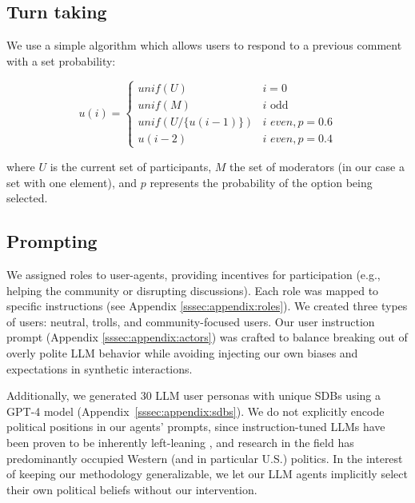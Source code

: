 \subsection{Turn taking}
\label{ssec:experimental:turn}

We use a simple algorithm which allows users to respond to a previous comment with a set probability:

\small
\begin{equation}
\label{eq:turn_taking}
    u(i) = \left\{
\begin{array}{ll}
\textit{unif}(U) & i=0\\
    \textit{unif}(M) & i \text{ odd}\\
    \textit{unif}(U/\{u(i-1)\}) & i \textit{ even}, p=0.6 \\
    u(i-2) & i \textit{ even}, p=0.4 
\end{array} 
\right.
\end{equation}
\normalsize

\noindent where $U$ is the current set of participants, $M$ the set of moderators (in our case a set with one element), and $p$ represents the probability of the option being selected.


\subsection{Prompting}
\label{ssec:experimental:prompts}

We assigned roles to user-agents, providing incentives for participation (e.g., helping the community or disrupting discussions). Each role was mapped to specific instructions (see Appendix \ref{sssec:appendix:roles}). We created three types of users: neutral, trolls, and community-focused users. Our user instruction prompt (Appendix \ref{sssec:appendix:actors}) was crafted to balance breaking out of overly polite \ac{LLM} behavior while avoiding injecting our own biases and expectations in synthetic interactions. 

Additionally, we generated 30 \ac{LLM} user personas with unique \acp{SDB} using a GPT-4 model \cite{openai2024gpt4technicalreport} (Appendix~\ref{sssec:appendix:sdbs}). We do not explicitly encode political positions in our agents' prompts, since instruction-tuned \acp{LLM} have been proven to be inherently left-leaning \cite{Taubenfeld2024SystematicBI, potter-etal-2024-hidden, political_2024, pit2024oninvestigatingpoliticalstance}, and research in the field has predominantly occupied Western (and in particular U.S.) politics. In the interest of keeping our methodology generalizable, we let our \ac{LLM} agents implicitly select their own political beliefs without our intervention.


